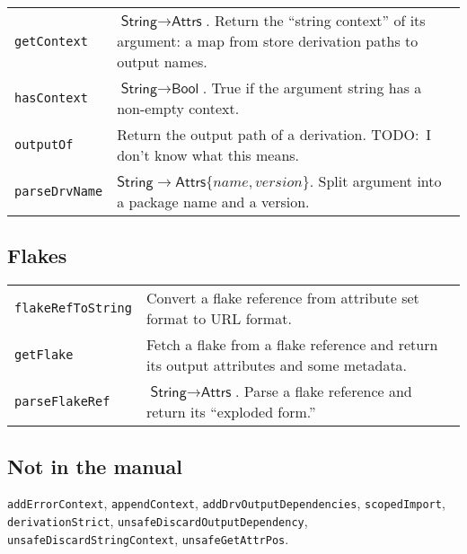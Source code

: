 \documentclass[9pt, a4paper, landscape]{extarticle}
\newcommand{\cmd}[1]{\texttt{#1}}
\newcommand{\str}{\textsf{String}}
\newcommand{\ats}{\textsf{Attrs}}
\newcommand{\bln}{\textsf{Bool}}
\begin{document}
\begin{multicols*}{3}
\begin{tabularx}{\columnwidth}{@{}l>{\raggedright\arraybackslash}X@{}}
  \cmd{getContext} & $\str\to\ats$. Return the ``string context'' of its
                   argument: a map from store derivation paths to
                   output names. \\
  \cmd{hasContext} & $\str\to\bln$. True if the argument string has a
                   non-empty context. \\  

  \cmd{outputOf} & Return the output path of a derivation. TODO:\ I
                   don't know what this means. \\

  \cmd{parseDrvName} & $\str\to\ats\{name, version\}$. Split argument
                       into a package name and a version. \\
  
\end{tabularx}


\subsection*{Flakes}

\begin{tabularx}{\columnwidth}{@{}l>{\raggedright\arraybackslash}X@{}}
\cmd{flakeRefToString} & Convert a flake reference from attribute set
                         format to URL format. \\
  
\cmd{getFlake} & Fetch a flake from a flake reference and return its
                 output attributes and some metadata. \\
  
\cmd{parseFlakeRef} & $\str\to\ats$. Parse a flake reference and return
                      its ``exploded form.'' \\

\end{tabularx}


\subsection*{Not in the manual}

\cmd{addErrorContext}, \cmd{appendContext},
\cmd{addDrvOutputDependencies}, \cmd{scopedImport}, \cmd{derivationStrict},
\cmd{unsafeDiscardOutputDependency}, \cmd{unsafeDiscardStringContext},
\cmd{unsafeGetAttrPos}.


\end{multicols*}
\end{document}
